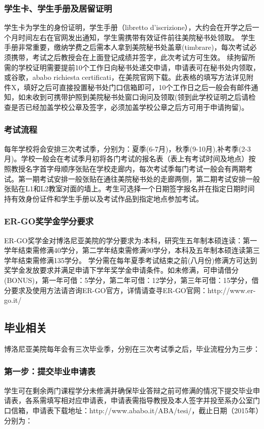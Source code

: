 \documentclass[3pt,a5paper,openright,twoside]{book}
\begin{document}
\subsubsection{学生卡、学生手册及居留证明}
学生卡为学生的身份证明，学生手册（libretto d’iscrizione），大约会在开学之后一个月时间左右在官网发出通知，学生需携带有效证件前往美院秘书处领取。
学生手册非常重要，缴纳学费之后需本人拿到美院秘书处盖章(timbrare)，每次考试必须携带，考试之后教授会在上面登记成绩并签字，此次考试方可生效。
续拘留所需的学校证明需要提前10个工作日向秘书处递交申请，申请表可在秘书处内领取，或谷歌，ababo richiesta certificati，在美院官网下载。此表格的填写方法详见附件X，填好之后可直接投置秘书处门口信箱即可，10个工作日之后一般会有邮件通知，如未收到可携带护照到美院秘书处窗口询问及领取(领到此学校证明之后请检查是否已经加盖学校公章及签字，必须加盖学校公章之后方可用于申请拘留)。

\subsubsection{考试流程}
每年学校将会安排三次考试季，分别为：夏季(6-7月)，秋季(9-10月),补考季(2-3月)。学校一般会在考试季月初将各门考试的报名表（表上有考试时间及地点）按照教授名字首字母顺序张贴在学校走廊内，每次考试季每门考试一般会有两期考试。第一期考试安排一般张贴在通往美院秘书处的走廊两侧，第二期考试安排一般张贴在L1和L2教室对面的墙上。考生可选择一个日期签字报名并在指定日期时间持有效身份证件和学生手册以及考试作品到指定地点参加考试。


\subsubsection{ER-GO奖学金学分要求}
ER-GO奖学金对博洛尼亚美院的学分要求为:本科，研究生五年制本硕连读：第一学年结束需修满40学分，第二学年结束需修满90学分，本科及五年制本硕连读第三学年结束需修满135学分。
学分需在每年夏季考试结束之前(八月份)修满方可达到奖学金发放要求并满足申请下学年奖学金申请条件。如未修满，可申请借分(BONUS)，第一年可借：5学分，第二年可借：12学分，第三年可借：15学分，借分要求及使用方法请咨询ER-GO官方，详情请查寻ER-GO官网：http://www.er-go.it/


\subsection{毕业相关}
博洛尼亚美院每年会有三次毕业季，分别在三次考试季之后，毕业流程分为三步：

\subsubsection{第一步：提交毕业申请表}
学生可在剩余两门课程学分未修满并确保毕业答辩之前可修满的情况下提交毕业申请表，各系需填写相对应申请表，申请表需指导教授及本人签字并投至系办公室门口信箱，申请表下载地址：http://www.ababo.it/ABA/tesi/，截止日期（2015年）分别为：
\end{document}
